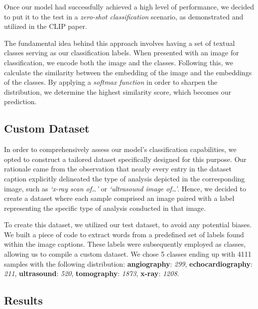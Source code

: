 \documentclass[10pt,twocolumn,letterpaper]{article}
\begin{document}
Once our model had successfully achieved a high level of performance, we decided to put it to the test in a \textit{zero-shot classification} scenario, as demonstrated and utilized in the CLIP paper.

The fundamental idea behind this approach involves having a set of textual classes serving as our classification labels. When presented with an image for classification, we encode both the image and the classes. Following this, we calculate the similarity between the embedding of the image and the embeddings of the classes. By applying a \textit{softmax function} in order to sharpen the distribution, we determine the highest similarity score, which becomes our prediction.

\subsection{Custom Dataset}
In order to comprehensively assess our model's classification capabilities, we opted to construct a tailored dataset specifically designed for this purpose. Our rationale came from the observation that nearly every entry in the dataset caption explicitly delineated the type of analysis depicted in the corresponding image, such as \textit{`x-ray scan of\ldots'} or \textit{ `ultrasound image of\ldots}'. Hence, we decided to create a dataset where each sample comprised an image paired with a label representing the specific type of analysis conducted in that image.

To create this dataset, we utilized our test dataset, to avoid any potential biases. We built a piece of code to extract words from a predefined set of labels found within the image captions. These labels were subsequently employed as classes, allowing us to compile a custom dataset. We chose 5 classes ending up with 4111 samples with the following distribution: \textbf{angiography}: \textit{299}, \textbf{echocardiography}: \textit{211}, \textbf{ultrasound}: \textit{520}, \textbf{tomography}: \textit{1873}, \textbf{x-ray}: \textit{1208}.


\subsection{Results}
\end{document}

